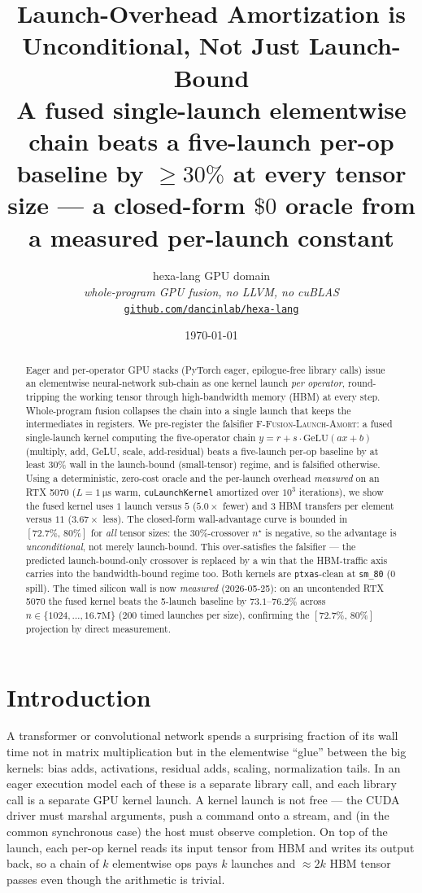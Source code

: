 \documentclass[11pt,a4paper]{article}
\title{
  \textbf{Launch-Overhead Amortization is Unconditional, Not Just Launch-Bound}\\[4pt]
  \large A fused single-launch elementwise chain beats a five-launch
  per-op baseline by $\ge 30\%$ at every tensor size --- a closed-form
  $\$0$ oracle from a measured per-launch constant
}
\author{
  hexa-lang GPU domain\\
  \normalsize\textit{whole-program GPU fusion, no LLVM, no cuBLAS}\\[2pt]
  \normalsize\href{https://github.com/dancinlab/hexa-lang}{\texttt{github.com/dancinlab/hexa-lang}}
}
\date{\today}
\newcommand{\falsifier}{\textsc{F-Fusion-Launch-Amort}}
\begin{document}
\maketitle

\begin{abstract}
Eager and per-operator GPU stacks (PyTorch eager, epilogue-free library
calls) issue an elementwise neural-network sub-chain as one kernel launch
\emph{per operator}, round-tripping the working tensor through high-bandwidth
memory (HBM) at every step. Whole-program fusion collapses the chain into a
single launch that keeps the intermediates in registers. We pre-register the
falsifier \falsifier: a fused single-launch kernel computing the five-operator
chain $y = r + s\cdot\mathrm{GeLU}(a x + b)$ (multiply, add, GeLU, scale,
add-residual) beats a five-launch per-op baseline by at least $30\%$ wall in
the launch-bound (small-tensor) regime, and is falsified otherwise. Using a
deterministic, zero-cost oracle and the per-launch overhead
\emph{measured} on an RTX 5070 ($L = \SI{1}{\micro\second}$ warm,
\texttt{cuLaunchKernel} amortized over $10^3$ iterations), we show the fused
kernel uses $1$ launch versus $5$ ($5.0\times$ fewer) and $3$ HBM transfers per
element versus $11$ ($3.67\times$ less). The closed-form wall-advantage curve is
bounded in $[72.7\%,\,80\%]$ for \emph{all} tensor sizes: the $30\%$-crossover
$n^\star$ is negative, so the advantage is \emph{unconditional}, not merely
launch-bound. This over-satisfies the falsifier --- the predicted launch-bound-only
crossover is replaced by a win that the HBM-traffic axis carries into the
bandwidth-bound regime too. Both kernels are \texttt{ptxas}-clean at \texttt{sm\_80}
($0$ spill). The timed silicon wall is now \emph{measured} (2026-05-25): on an
uncontended RTX 5070 the fused kernel beats the 5-launch baseline by
$73.1$--$76.2\%$ across $n\in\{1024,\dots,16.7\text{M}\}$ ($200$ timed launches
per size), confirming the $[72.7\%,\,80\%]$ projection by direct measurement.
\end{abstract}

\section{Introduction}
\label{sec:intro}

A transformer or convolutional network spends a surprising fraction of its
wall time not in matrix multiplication but in the elementwise ``glue'' between
the big kernels: bias adds, activations, residual adds, scaling, normalization
tails. In an eager execution model each of these is a separate library call,
and each library call is a separate GPU kernel launch. A kernel launch is not
free --- the CUDA driver must marshal arguments, push a command onto a stream,
and (in the common synchronous case) the host must observe completion. On top
of the launch, each per-op kernel reads its input tensor from HBM and writes
its output back, so a chain of $k$ elementwise ops pays $k$ launches and
$\approx 2k$ HBM tensor passes even though the arithmetic is trivial.
\end{document}

